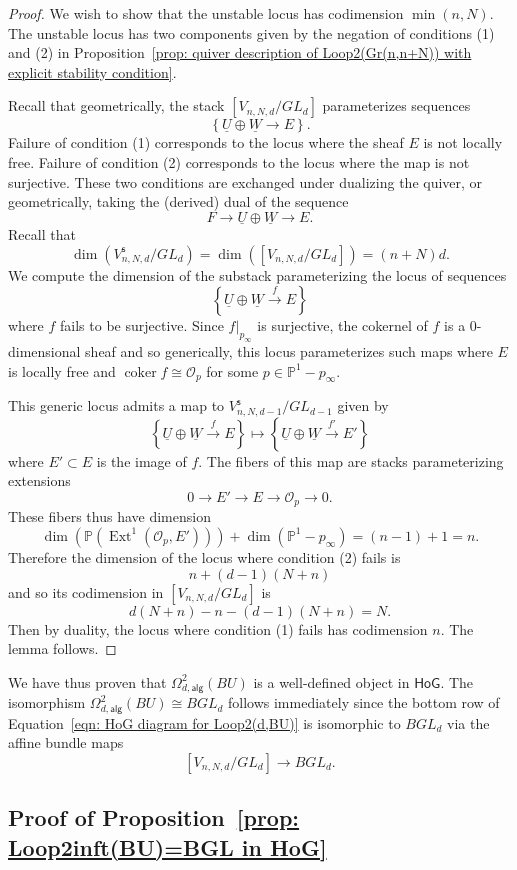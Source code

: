 \message{ !name(Bryan-Vakil.tex)}\documentclass{amsart}
\theoremstyle{definition}
\newcommand{\HoG}{\textsf{HoG}}
\newcommand{\PP}{\mathbb{P}}
\newcommand{\OO}{\mathcal{O}}
\newcommand{\Ext}{\operatorname{Ext}}
\newcommand{\coker}{\operatorname{coker}}
\newcommand{\UL}[1]{\underline{#1}}
\newcommand{\alg}{\mathsf{alg}}
\newcommand{\stable}{\mathsf{s}}
\newcommand{\LoopTwo}{\Omega^{2}_{d,\alg}}
\begin{document}
\begin{proof}
We wish to show that the unstable locus has codimension
$\min(n,N)$. The unstable locus has two components given by the
negation of conditions (1) and (2) in Proposition~\ref{prop: quiver
description of Loop2(Gr(n,n+N)) with explicit stability condition}.

Recall that geometrically, the stack $\left[V_{n,N,d}/GL_{d} \right]$
parameterizes sequences
\[
\left\{\UL{U}\oplus \UL{W}\to E \right\}.
\]
Failure of condition (1) corresponds to the locus where the sheaf $E$
is not locally free. Failure of condition (2) corresponds to the locus
where the map is not surjective. These two conditions are exchanged
under dualizing the quiver, or geometrically, taking the (derived)
dual of the sequence 
\[
F\to \UL{U}\oplus \UL{W}\to E.
\]
Recall that 
\[
\dim (V^{\stable}_{n,N,d}/GL_{d}) = \dim (\left[V_{n,N,d}/GL_{d}
\right]) =  (n+N)d.
\]
We compute the dimension of the substack parameterizing the locus of
sequences 
\[
\left\{\UL{U}\oplus \UL{W}\xrightarrow{f}E \right\}
\]
where $f$ fails to be surjective. Since $f|_{p_{\infty}}$ is
surjective, the cokernel of $f$ is a 0-dimensional sheaf and so
generically, this locus parameterizes such maps where $E$ is locally
free and $\coker f \cong \OO_{p}$ for some $p\in \PP^{1}-p_{\infty}$.

This generic locus admits a map to
$V^{\stable}_{n,N,d-1}/GL_{d-1}$ given by 
\[
\left\{\UL{U}\oplus \UL{W}\xrightarrow{f}E \right\}\mapsto
\left\{\UL{U}\oplus \UL{W}\xrightarrow{f' }E' \right\}
\]
where $E'\subset E$ is the image of $f$. The fibers of this map are
stacks parameterizing extensions
\[
0\to E' \to E\to \OO_{p}\to 0.
\]
These fibers thus have dimension
\[
\dim (\PP (\Ext^{1}(\OO_{p},E'))) +\dim  (\PP^{1}-p_{\infty}) =
(n-1)+1 = n.
\]
Therefore the dimension of the locus where condition (2) fails is 
\[
n+(d-1)(N+n)
\]
and so its codimension in $\left[V_{n,N,d}/GL_{d} \right]$ is 
\[
d(N+n) - n -(d-1)(N+n) = N.
\]
Then by duality, the locus where condition (1) fails has codimension
$n$. The lemma follows.
\end{proof}

We have thus proven that $\LoopTwo (BU)$ is a well-defined object in
$\HoG$. The isomorphism $\LoopTwo (BU)\cong BGL_{d}$ follows
immediately since the bottom row of Equation~\eqref{eqn: HoG diagram
for Loop2(d,BU)} is isomorphic to $BGL_{d}$ via the affine bundle maps
\[
\left[V_{n,N,d}/GL_{d} \right] \to BGL_{d}.
\]

\subsection{Proof of Proposition~\ref{prop: Loop2inft(BU)=BGL in HoG}}
\end{document}
